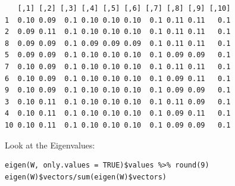 \documentclass[11pt]{article}
\begin{document}
\begin{verbatim}
   [,1] [,2] [,3] [,4] [,5] [,6] [,7] [,8] [,9] [,10]
1  0.10 0.09  0.1 0.10 0.10 0.10  0.1 0.11 0.11   0.1
2  0.09 0.11  0.1 0.10 0.10 0.10  0.1 0.11 0.11   0.1
8  0.09 0.09  0.1 0.09 0.09 0.09  0.1 0.11 0.11   0.1
5  0.09 0.09  0.1 0.10 0.10 0.10  0.1 0.09 0.09   0.1
7  0.10 0.09  0.1 0.10 0.10 0.10  0.1 0.11 0.11   0.1
6  0.10 0.09  0.1 0.10 0.10 0.10  0.1 0.09 0.11   0.1
9  0.10 0.09  0.1 0.10 0.10 0.10  0.1 0.09 0.09   0.1
3  0.10 0.11  0.1 0.10 0.10 0.10  0.1 0.11 0.09   0.1
4  0.10 0.11  0.1 0.10 0.10 0.10  0.1 0.09 0.11   0.1
10 0.10 0.11  0.1 0.10 0.10 0.10  0.1 0.09 0.09   0.1
\end{verbatim}

Look at the Eigenvalues:
\lstset{language=r,label= ,caption= ,captionpos=b,numbers=none}
\begin{lstlisting}
eigen(W, only.values = TRUE)$values %>% round(9)
eigen(W)$vectors/sum(eigen(W)$vectors)
\end{lstlisting}
\end{document}
